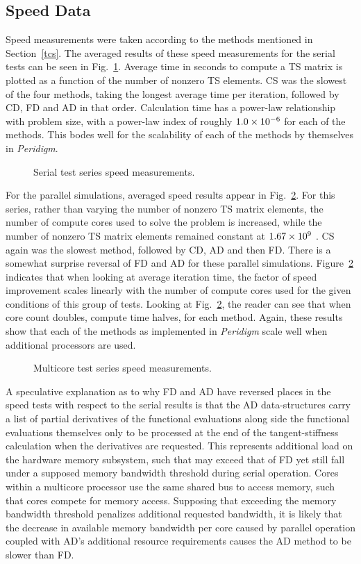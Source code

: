 \documentclass[preprint,12pt]{elsarticle}
\begin{document}
\subsection{Speed Data} Speed measurements were taken according to the methods
mentioned in Section~\ref{tcs}. The averaged results of these speed
measurements for the serial tests can be seen in Fig.~\ref{fig:serial_speed}.
Average time in seconds to compute a TS matrix is plotted as a function of the
number of nonzero TS elements.  CS was the slowest of the four methods, taking
the longest average time per iteration,  followed by CD, FD and AD in that
order. Calculation time has a power-law relationship with problem size, with a
power-law index of roughly $\num{1.0E-6}$ for each of the methods. This bodes
well for the scalability of each of the methods by themselves in
\emph{Peridigm}.
%
\begin{figure}[tbp] \centering \scalebox{1.0}{}
\caption{Serial test series speed measurements.} \label{fig:serial_speed}
\end{figure}
%
For the parallel simulations, averaged speed results appear in
Fig.~\ref{fig:multi_speed}. For this series, rather than varying the number of
nonzero TS matrix elements, the number of compute cores used to solve the
problem is increased, while the number of nonzero TS matrix elements remained
constant at $\num{1.67E9}$ .  CS again was the slowest method, followed by CD,
AD and then FD.  There is a somewhat surprise reversal of FD and AD for these
parallel simulations.  Figure~\ref{fig:multi_speed} indicates that when looking
at average iteration time, the factor of speed improvement scales linearly with
the number of compute cores used for the given conditions of this group of
tests. Looking at Fig.~\ref{fig:multi_speed}, the reader can see that when core
count doubles, compute time halves, for each method. Again, these results show
that each of the methods as implemented in \emph{Peridigm} scale well when
additional processors are used. 
%
\begin{figure}[tbp] \centering \scalebox{1.0}{}
\caption{Multicore test series speed measurements.} \label{fig:multi_speed}
\end{figure}
%
A speculative explanation as to why FD and AD have reversed places in the speed
tests with respect to the serial results is that the AD data-structures carry a
list of partial derivatives of the functional evaluations along side the
functional evaluations themselves only to be processed at the end of the
tangent-stiffness calculation when the derivatives are requested. This
represents additional load on the hardware memory subsystem, such that may
exceed that of FD yet still fall under a supposed memory bandwidth threshold
during serial operation. Cores within a multicore processor use the same shared
bus to access memory, such that cores compete for memory access. Supposing that
exceeding the memory bandwidth threshold penalizes additional requested
bandwidth, it is likely that the decrease in available memory bandwidth per
core caused by parallel operation coupled with AD's additional resource
requirements causes the AD method to be slower than FD. 
\end{document}
